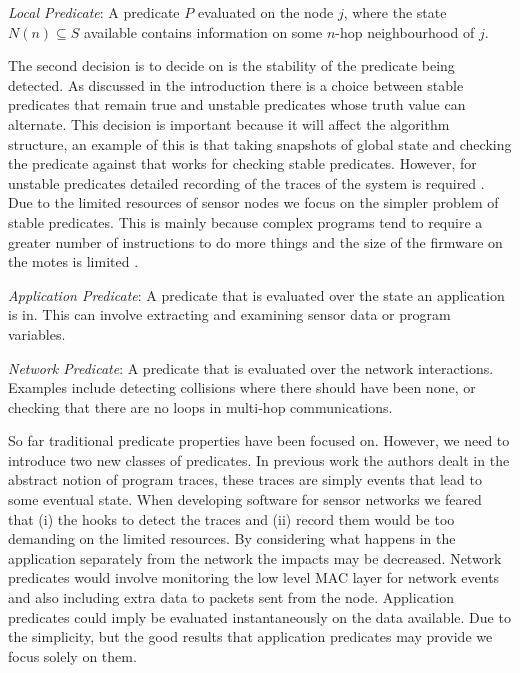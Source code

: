 \begin{mydef}
\emph{Local Predicate}: A predicate $P$ evaluated on the node $j$, where the state $N(n) \subseteq S$ available contains information on some $n$-hop neighbourhood of $j$.
\end{mydef}

The second decision is to decide on is the stability of the predicate being detected. As discussed in the introduction there is a choice between stable predicates that remain true and unstable predicates whose truth value can alternate. This decision is important because it will affect the algorithm structure, an example of this is that taking snapshots of global state and checking the predicate against that works for checking stable predicates. However, for unstable predicates detailed recording of the traces of the system is required \cite{bansod2004distributed}. Due to the limited resources of sensor nodes we focus on the simpler problem of stable predicates. This is mainly because complex programs tend to require a greater number of instructions to do more things and the size of the firmware on the motes is limited \cite{CM5000}.


\begin{mydef}
\emph{Application Predicate}: A predicate that is evaluated over the state an application is in. This can involve extracting and examining sensor data or program variables.
\end{mydef}

\begin{mydef}
\emph{Network Predicate}: A predicate that is evaluated over the network interactions. Examples include detecting collisions where there should have been none, or checking that there are no loops in multi-hop communications.
\end{mydef}

So far traditional predicate properties have been focused on. However, we need to introduce two new classes of predicates. In previous work the authors dealt in the abstract notion of program traces, these traces are simply events that lead to some eventual state. When developing software for sensor networks we feared that (i) the hooks to detect the traces and (ii) record them would be too demanding on the limited resources. By considering what happens in the application separately from the network the impacts may be decreased. Network predicates would involve monitoring the low level MAC layer for network events and also including extra data to packets sent from the node. Application predicates could imply be evaluated instantaneously on the data available. Due to the simplicity, but the good results that application predicates may provide we focus solely on them.

